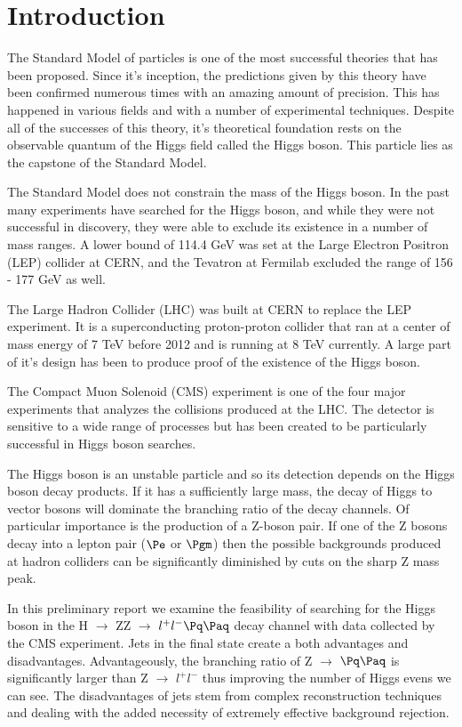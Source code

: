 \chapter{Introduction}


The Standard Model of particles is one of the most successful theories that has been proposed. Since it's inception, the predictions given by this theory have been confirmed numerous times with an amazing amount of precision. This has happened in various fields and with a number of experimental techniques. Despite all of the successes of this theory, it's theoretical foundation rests on the observable quantum of the Higgs field called the Higgs boson. This particle lies as the capstone of the Standard Model. 

The Standard Model does not constrain the mass of the Higgs boson. In the past many experiments have searched for the Higgs boson, and while they were not successful in discovery, they were able to exclude its existence in a number of mass ranges. A lower bound of 114.4 GeV was set at the  Large Electron Positron (LEP) collider at CERN, and the Tevatron at Fermilab excluded the range of 156 - 177 GeV as well.

The Large Hadron Collider (LHC) was built at CERN to replace the LEP experiment. It is a superconducting proton-proton collider that ran at a center of mass energy of 7 TeV before 2012 and is running at 8 TeV currently. A large part of it's design has been to produce proof of the existence of the Higgs boson.

The Compact Muon Solenoid (CMS) experiment is one of the four major experiments that analyzes the collisions produced at the LHC. The detector is sensitive to a wide range of processes but has been created to be particularly successful in Higgs boson searches.

The Higgs boson is an unstable particle and so its detection depends on the Higgs boson decay products. If it has a sufficiently large mass, the decay of Higgs to vector bosons will dominate the branching ratio of the decay channels. Of particular importance is the production of a Z-boson pair. If one of the Z bosons decay into a lepton pair ($\Pe$ or $\Pgm$) then the possible backgrounds produced at hadron colliders can be significantly diminished by cuts on the sharp Z mass peak.

In this preliminary report we examine the feasibility of searching for the Higgs boson in the  H $\rightarrow$ ZZ $\rightarrow$ $l^{+}l^{-} \Pq \Paq$ decay channel with data collected by the CMS experiment. Jets in the final state create a both advantages and disadvantages.  Advantageously, the branching ratio of Z $\rightarrow$  $\Pq \Paq$ is significantly larger than Z $\rightarrow$  $l^{+}l^{-}$ thus improving the number of Higgs evens we can see.  The disadvantages of jets stem from complex reconstruction techniques and dealing with the added necessity of extremely effective background rejection.

